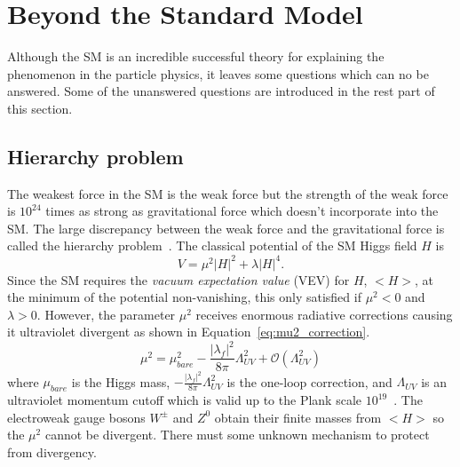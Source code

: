 
\section{Beyond the Standard Model}
\label{sec:sm_bsm}
Although the SM is an incredible successful theory for explaining the phenomenon in the particle physics, it leaves some questions which can no be answered.
Some of the unanswered questions are introduced in the rest part of this section.


\subsection{Hierarchy problem}
\label{subsec:sm_hierarchy_problem}
The weakest force in the SM is the weak force but the strength of the weak force is $10^{24}$ times as strong as gravitational force which doesn't incorporate into the SM.
The large discrepancy between the weak force and the gravitational force is called the hierarchy problem~\cite{Martin:1997ns}.
The classical potential of the SM Higgs field $H$ is
\begin{equation}
V = \mu^{2} |H|^2 + \lambda |H|^4.
\end{equation}
Since the SM requires the \textit{vacuum expectation value} (VEV) for $H$, $<H>$, at the minimum of the potential non-vanishing, this only satisfied if $\mu^{2} < 0$ and $\lambda > 0$.
However, the parameter $\mu^{2}$ receives enormous radiative corrections causing it ultraviolet divergent as shown in Equation~\ref{eq:mu2_correction}.
\begin{equation}
\mu^{2} = \mu_{bare}^{2} - \frac{|\lambda_{f}|^{2}}{8\pi}\Lambda_{UV}^{2} + \mathcal{O}(\Lambda_{UV}^{2})
\label{eq:mu2_correction}
\end{equation}
where $\mu_{bare}$ is the Higgs mass, $- \frac{|\lambda_{f}|^{2}}{8\pi}\Lambda_{UV}^{2}$ is the one-loop correction, and $\Lambda_{UV}$ is an ultraviolet momentum cutoff which is valid up to the Plank scale $10^{19}$~{\GeV}.
The electroweak gauge bosons $W^{\pm}$ and $Z^{0}$ obtain their finite masses from $<H>$ so the $\mu^{2}$ cannot be divergent.
There must some unknown mechanism to protect from divergency.


